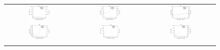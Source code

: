 \documentclass[review,3p]{elsarticle}
\begin{document}
\begin{figure}[!t]
\begin{tabular}{ccc}
  \includegraphics[width=0.32\textwidth]{images/HighMutRatio_150000/F11_50_HighMutRatio} & \includegraphics[width=0.32\textwidth]{images/HighMutRatio_150000/F12_50_HighMutRatio} & \includegraphics[width=0.32\textwidth]{images/HighMutRatio_150000/F13_50_HighMutRatio} \\
  \includegraphics[width=0.32\textwidth]{images/HighMutRatio_150000/F14_50_HighMutRatio} & \includegraphics[width=0.32\textwidth]{images/HighMutRatio_150000/F15_50_HighMutRatio} & \includegraphics[width=0.32\textwidth]{images/HighMutRatio_150000/F16_50_HighMutRatio} \\ \\

\end{tabular}
\end{figure}
\end{document}
